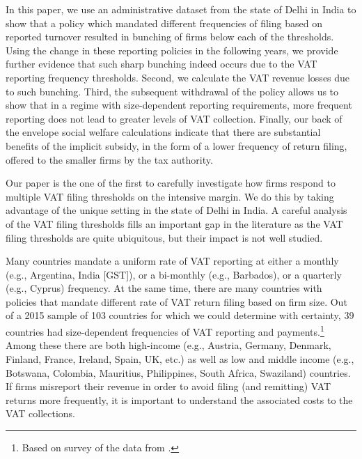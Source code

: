 In this paper, we use an administrative dataset from the state of Delhi in India to show that a policy which mandated different frequencies of filing based on reported turnover resulted in bunching of firms below each of the thresholds. Using the change in these reporting policies in the following years, we provide further evidence that such sharp bunching indeed occurs due to the VAT reporting frequency thresholds. Second, we calculate the VAT revenue losses due to such bunching. Third, the subsequent withdrawal of the policy allows us to show that in a regime with size-dependent reporting requirements, more frequent reporting does not lead to greater levels of VAT collection. Finally, our back of the envelope social welfare calculations indicate that there are substantial benefits of the implicit subsidy, in the form of a lower frequency of return filing, offered to the smaller firms by the tax authority.

Our paper is the one of the first to carefully investigate how firms respond to multiple VAT filing thresholds on the intensive margin. We do this by taking advantage of the unique setting in the state of Delhi in India. A careful analysis of the VAT filing thresholds fills an important gap in the literature as the VAT filing thresholds are quite ubiquitous, but their impact is not well studied. 

Many countries mandate a uniform rate of VAT reporting at either a monthly (e.g., Argentina, India [GST]), or a bi-monthly (e.g., Barbados), or a quarterly (e.g., Cyprus) frequency. At the same time, there are many countries with policies that mandate different rate of VAT return filing based on firm size. Out of a 2015 sample of 103 countries for which we could determine with certainty, 39 countries had size-dependent frequencies of VAT reporting and payments.\footnote{Based on survey of the data from \citet{ey2015worldwideguide}.} Among these there are both high-income (e.g., Austria, Germany, Denmark, Finland, France, Ireland, Spain, UK, etc.) as well as low and middle income (e.g., Botswana, Colombia, Mauritius, Philippines, South Africa, Swaziland) countries. If firms misreport their revenue in order to avoid filing (and remitting) VAT returns more frequently, it is important to understand the associated costs to the VAT collections. 

% 

